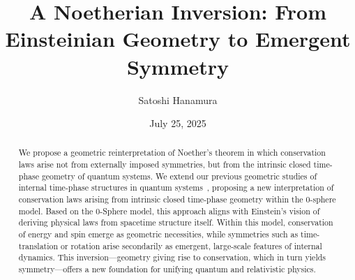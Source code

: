 \documentclass[%
 reprint,
 amsmath,amssymb,
 aps,
]{revtex4-1}
\numberwithin{equation}{section}%
\begin{document}


\title{A Noetherian Inversion: From Einsteinian Geometry to Emergent Symmetry}
\author{Satoshi Hanamura}
\date{July 25, 2025}





\begin{abstract}
We propose a geometric reinterpretation of Noether’s theorem in which conservation laws arise not from externally imposed symmetries, but from the intrinsic closed time-phase geometry of quantum systems. We extend our previous geometric studies of internal time-phase structures in quantum systems~\cite{hanamura2506.0119, hanamura2507.0128}, proposing a new interpretation of conservation laws arising from intrinsic closed time-phase geometry within the 0-sphere model. Based on the 0-Sphere model, this approach aligns with Einstein’s vision of deriving physical laws from spacetime structure itself. Within this model, conservation of energy and spin emerge as geometric necessities, while symmetries such as time-translation or rotation arise secondarily as emergent, large-scale features of internal dynamics. This inversion—geometry giving rise to conservation, which in turn yields symmetry—offers a new foundation for unifying quantum and relativistic physics.
\end{abstract}
\end{document}
